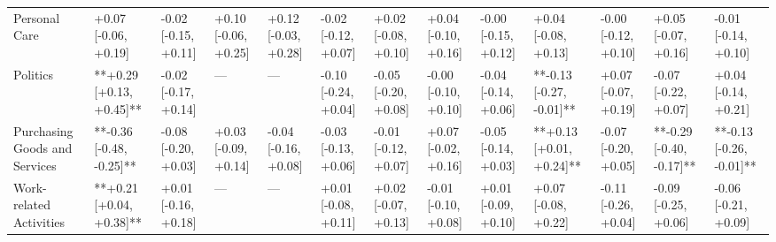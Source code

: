 \begin{tabular}{lllllllllllll}
Personal Care & +0.07 [-0.06, +0.19] & -0.02 [-0.15, +0.11] & +0.10 [-0.06, +0.25] & +0.12 [-0.03, +0.28] & -0.02 [-0.12, +0.07] & +0.02 [-0.08, +0.10] & +0.04 [-0.10, +0.16] & -0.00 [-0.15, +0.12] & +0.04 [-0.08, +0.13] & -0.00 [-0.12, +0.10] & +0.05 [-0.07, +0.16] & -0.01 [-0.14, +0.10] \\
Politics & **+0.29 [+0.13, +0.45]** & -0.02 [-0.17, +0.14] & — & — & -0.10 [-0.24, +0.04] & -0.05 [-0.20, +0.08] & -0.00 [-0.10, +0.10] & -0.04 [-0.14, +0.06] & **-0.13 [-0.27, -0.01]** & +0.07 [-0.07, +0.19] & -0.07 [-0.22, +0.07] & +0.04 [-0.14, +0.21] \\
Purchasing Goods and Services & **-0.36 [-0.48, -0.25]** & -0.08 [-0.20, +0.03] & +0.03 [-0.09, +0.14] & -0.04 [-0.16, +0.08] & -0.03 [-0.13, +0.06] & -0.01 [-0.12, +0.07] & +0.07 [-0.02, +0.16] & -0.05 [-0.14, +0.03] & **+0.13 [+0.01, +0.24]** & -0.07 [-0.20, +0.05] & **-0.29 [-0.40, -0.17]** & **-0.13 [-0.26, -0.01]** \\
Work-related Activities & **+0.21 [+0.04, +0.38]** & +0.01 [-0.16, +0.18] & — & — & +0.01 [-0.08, +0.11] & +0.02 [-0.07, +0.13] & -0.01 [-0.10, +0.08] & +0.01 [-0.09, +0.10] & +0.07 [-0.08, +0.22] & -0.11 [-0.26, +0.04] & -0.09 [-0.25, +0.06] & -0.06 [-0.21, +0.09] \\
\bottomrule
\end{tabular}
